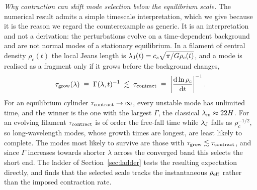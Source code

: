 \documentclass[usenatbib,twoside,twocolumn]{mnras}
\begin{document}
\emph{Why contraction can shift mode selection below the equilibrium scale.} The numerical result admits a simple timescale interpretation, which we give because it is the reason we regard the counterexample as generic. It is an interpretation and not a derivation: the perturbations evolve on a time-dependent background and are not normal modes of a stationary equilibrium. In a filament of central density $\rho_c(t)$ the local Jeans length is $\lambda_{\rm J}(t)=c_s\sqrt{\pi/G\rho_c(t)}$, and a mode is realised as a fragment only if it grows before the background changes,
\begin{equation}
\tau_{\rm grow}(\lambda)\;\equiv\;\Gamma(\lambda,t)^{-1}\;\lesssim\;\tau_{\rm contract}\;\equiv\;\left|\frac{{\rm d}\ln\rho_c}{{\rm d}t}\right|^{-1}.
\label{eq:freezeout}
\end{equation}
For an equilibrium cylinder $\tau_{\rm contract}\to\infty$, every unstable mode has unlimited time, and the winner is the one with the largest $\Gamma$, the classical $\lambda_{\rm m}\approx22H$. For an evolving filament $\tau_{\rm contract}$ is of order the free-fall time while $\lambda_{\rm J}$ falls as $\rho_c^{-1/2}$, so long-wavelength modes, whose growth times are longest, are least likely to complete. The modes most likely to survive are those with $\tau_{\rm grow}\lesssim\tau_{\rm contract}$, and since $\Gamma$ increases towards shorter $\lambda$ across the converged band this selects the short end. The ladder of Section~\ref{sec:ladder} tests the resulting expectation directly, and finds that the selected scale tracks the instantaneous $\rho_{\rm eff}$ rather than the imposed contraction rate.






\bsp
\label{lastpage}
\end{document}
